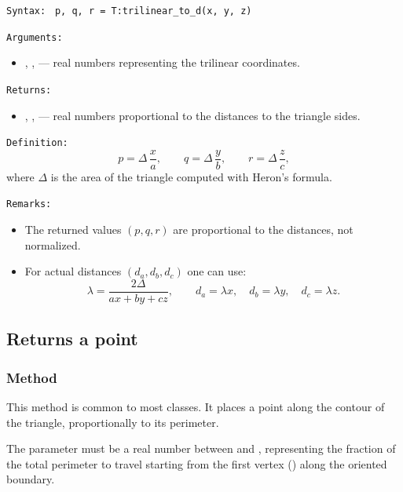 \medskip
\texttt{Syntax: }
\verb|p, q, r = T:trilinear_to_d(x, y, z)|

\medskip
\texttt{Arguments: }
\begin{itemize}
  \item {}, ,  — real numbers representing the trilinear coordinates.
\end{itemize}

\texttt{Returns: }
\begin{itemize}
  \item {}, ,  — real numbers proportional to the distances to the triangle sides.
\end{itemize}

\texttt{Definition: }
\[
p = \Delta\,\frac{x}{a}, \qquad
q = \Delta\,\frac{y}{b}, \qquad
r = \Delta\,\frac{z}{c},
\]
where \(\Delta\) is the area of the triangle computed with Heron’s formula.

\medskip
\texttt{Remarks: }
\begin{itemize}
  \item The returned values \((p,q,r)\) are proportional to the distances, not normalized.
  \item For actual distances \((d_a,d_b,d_c)\) one can use:
  \[
    \lambda = \frac{2\Delta}{ax + by + cz}, \qquad
    d_a = \lambda x,\quad d_b = \lambda y,\quad d_c = \lambda z.
  \]
\end{itemize}




\subsection{Returns  a point}

\subsubsection{Method }
\label{ssub:method_triangle_point_r}

This method is common to most classes. It places a point along the contour of the triangle, proportionally to its perimeter.

\medskip

The parameter  must be a real number between  and , representing the fraction of the total perimeter to travel starting from the first vertex () along the oriented boundary.

